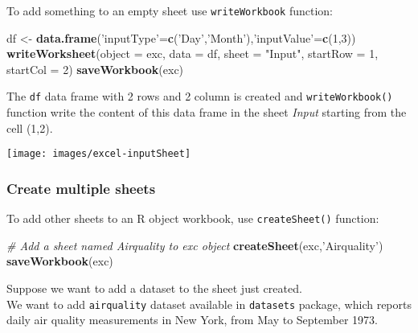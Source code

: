 \documentclass[]{book}
\newenvironment{Shaded}{\begin{snugshade}}{\end{snugshade}}
\newcommand{\KeywordTok}[1]{\textcolor[rgb]{0.13,0.29,0.53}{\textbf{{#1}}}}
\newcommand{\DataTypeTok}[1]{\textcolor[rgb]{0.13,0.29,0.53}{{#1}}}
\newcommand{\DecValTok}[1]{\textcolor[rgb]{0.00,0.00,0.81}{{#1}}}
\newcommand{\StringTok}[1]{\textcolor[rgb]{0.31,0.60,0.02}{{#1}}}
\newcommand{\CommentTok}[1]{\textcolor[rgb]{0.56,0.35,0.01}{\textit{{#1}}}}
\newcommand{\OtherTok}[1]{\textcolor[rgb]{0.56,0.35,0.01}{{#1}}}
\newcommand{\NormalTok}[1]{{#1}}
\begin{document}
To add something to an empty sheet use \texttt{writeWorkbook} function:

\begin{Shaded}
\begin{Highlighting}[]
\NormalTok{df <-}\StringTok{ }\KeywordTok{data.frame}\NormalTok{(}\StringTok{'inputType'}\NormalTok{=}\KeywordTok{c}\NormalTok{(}\StringTok{'Day'}\NormalTok{,}\StringTok{'Month'}\NormalTok{),}\StringTok{'inputValue'}\NormalTok{=}\KeywordTok{c}\NormalTok{(}\DecValTok{1}\NormalTok{,}\DecValTok{3}\NormalTok{))}
\KeywordTok{writeWorksheet}\NormalTok{(}\DataTypeTok{object =} \NormalTok{exc, }\DataTypeTok{data =} \NormalTok{df, }\DataTypeTok{sheet =} \StringTok{"Input"}\NormalTok{, }\DataTypeTok{startRow =} \DecValTok{1}\NormalTok{, }\DataTypeTok{startCol =} \DecValTok{2}\NormalTok{)}
\KeywordTok{saveWorkbook}\NormalTok{(exc)}
\end{Highlighting}
\end{Shaded}

The \texttt{df} data frame with 2 rows and 2 column is created and
\texttt{writeWorkbook()} function write the content of this data frame
in the sheet \emph{Input} starting from the cell (1,2).

\texttt{[image: images/excel-inputSheet]}

\subsubsection{Create multiple sheets}\label{create-multiple-sheets}

To add other sheets to an R object workbook, use \texttt{createSheet()}
function:

\begin{Shaded}
\begin{Highlighting}[]
\CommentTok{# Add a sheet named Airquality to exc object}
\KeywordTok{createSheet}\NormalTok{(exc,}\StringTok{'Airquality'}\NormalTok{)}
\KeywordTok{saveWorkbook}\NormalTok{(exc)}
\end{Highlighting}
\end{Shaded}

Suppose we want to add a dataset to the sheet just created.\\
We want to add \texttt{airquality} dataset available in
\texttt{datasets} package, which reports daily air quality measurements
in New York, from May to September 1973.

\begin{Shaded}
\end{Shaded}
\end{document}
